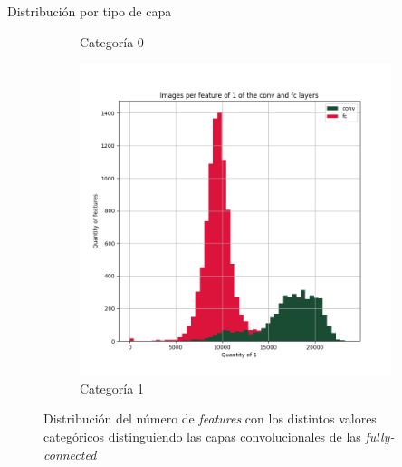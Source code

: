 \documentclass{beamer}
\begin{document}
\begin{frame}{Distribución por tipo de capa}
\begin{figure}[ht]
\begin{subfigure}[b]{0.32\textwidth}
		\caption{Categoría 0}
	\end{subfigure}
	\begin{subfigure}[b]{0.32\textwidth}
		\includegraphics[width=\textwidth]  {Images/plots/25/Images_per_feature_of_1_category_all_layers.png}
		\caption{Categoría 1}
	\end{subfigure}       
	\caption{Distribución del número de \textit{features} con los distintos valores categóricos distinguiendo las capas convolucionales de las \textit{fully-connected}  \label{fig:imagesperfeature}}
\end{figure}


\end{frame}
\end{document}
